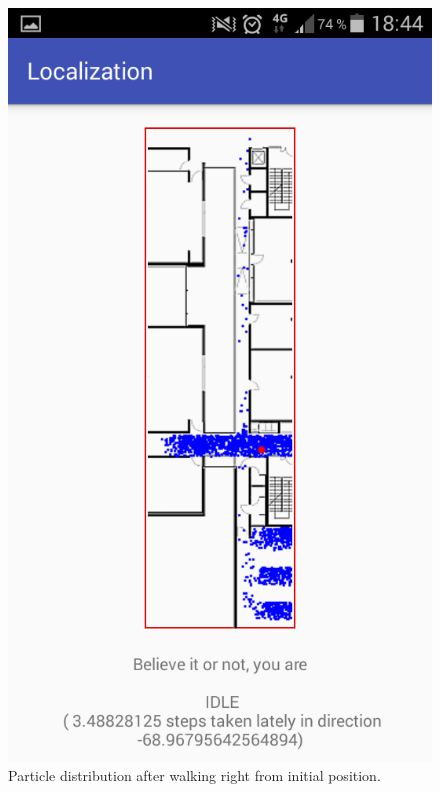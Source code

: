 \documentclass[conference]{IEEEtran}
\begin{document}
\begin{figure}[!htp]
\begin{center}
\includegraphics[width=0.7\linewidth]{fig/right}
\caption{Particle distribution after walking right from initial position.}\label{fig:right}
\end{center}
\end{figure}
\end{document}
